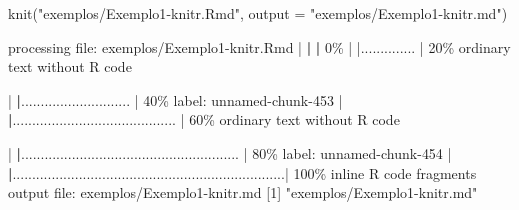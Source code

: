 \documentclass[
  10pt,
  a4paper]{book}
\newenvironment{Shaded}{\begin{snugshade}}{\end{snugshade}}
\newcommand{\AttributeTok}[1]{\textcolor[rgb]{0.77,0.63,0.00}{#1}}
\newcommand{\DecValTok}[1]{\textcolor[rgb]{0.00,0.00,0.81}{#1}}
\newcommand{\ErrorTok}[1]{\textcolor[rgb]{0.64,0.00,0.00}{\textbf{#1}}}
\newcommand{\FunctionTok}[1]{\textcolor[rgb]{0.00,0.00,0.00}{#1}}
\newcommand{\NormalTok}[1]{#1}
\newcommand{\SpecialCharTok}[1]{\textcolor[rgb]{0.00,0.00,0.00}{#1}}
\newcommand{\StringTok}[1]{\textcolor[rgb]{0.31,0.60,0.02}{#1}}
\begin{document}
\begin{Shaded}
\begin{Highlighting}[]
\FunctionTok{knit}\NormalTok{(}\StringTok{"exemplos/Exemplo1{-}knitr.Rmd"}\NormalTok{, }\AttributeTok{output =} \StringTok{"exemplos/Exemplo1{-}knitr.md"}\NormalTok{)}


\NormalTok{processing file}\SpecialCharTok{:}\NormalTok{ exemplos}\SpecialCharTok{/}\NormalTok{Exemplo1}\SpecialCharTok{{-}}\NormalTok{knitr.Rmd}
  \SpecialCharTok{|}                                                                              \ErrorTok{|}                                                                      \ErrorTok{|}   \DecValTok{0}\SpecialCharTok{\%  |                                                                              |..............                                                        |  20\%}
\NormalTok{  ordinary text without R code}

  \SpecialCharTok{|}                                                                              \ErrorTok{|}\NormalTok{............................                                          }\SpecialCharTok{|}  \DecValTok{40}\NormalTok{\%}
\NormalTok{label}\SpecialCharTok{:}\NormalTok{ unnamed}\SpecialCharTok{{-}}\NormalTok{chunk}\DecValTok{{-}453}
  \SpecialCharTok{|}                                                                              \ErrorTok{|}\NormalTok{..........................................                            }\SpecialCharTok{|}  \DecValTok{60}\NormalTok{\%}
\NormalTok{  ordinary text without R code}

  \SpecialCharTok{|}                                                                              \ErrorTok{|}\NormalTok{........................................................              }\SpecialCharTok{|}  \DecValTok{80}\NormalTok{\%}
\NormalTok{label}\SpecialCharTok{:}\NormalTok{ unnamed}\SpecialCharTok{{-}}\NormalTok{chunk}\DecValTok{{-}454}
  \SpecialCharTok{|}                                                                              \ErrorTok{|}\NormalTok{......................................................................}\SpecialCharTok{|} \DecValTok{100}\NormalTok{\%}
\NormalTok{   inline R code fragments}
\NormalTok{output file}\SpecialCharTok{:}\NormalTok{ exemplos}\SpecialCharTok{/}\NormalTok{Exemplo1}\SpecialCharTok{{-}}\NormalTok{knitr.md}
\NormalTok{[}\DecValTok{1}\NormalTok{] }\StringTok{"exemplos/Exemplo1{-}knitr.md"}
\end{Highlighting}
\end{Shaded}
\end{document}
